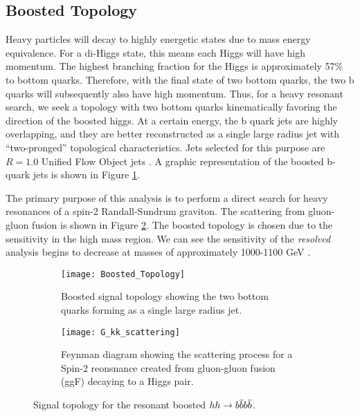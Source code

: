 \documentclass[12pt]{article}
\begin{document}
\subsection{Boosted Topology}
Heavy particles will decay to highly energetic states due to mass energy
equivalence. For a di-Higgs state, this means each Higgs will have high
momentum. The highest branching fraction for the Higgs is approximately 57\% to
bottom quarks. Therefore, with the final state of two bottom quarks, the two b
quarks will subsequently also have high momentum. Thus, for a heavy resonant
search, we seek a topology with two bottom quarks kinematically favoring the
direction of the boosted higgs. At a certain energy, the b quark jets are highly
overlapping, and they are better reconstructed as a single large radius jet with
``two-pronged'' topological characteristics. Jets selected for this purpose are
$R=1.0$ Unified Flow Object jets \cite{boosted_hbbcc_tagger, large_r_jet}. A
graphic representation of the boosted b-quark jets is shown in Figure
\ref{subfig:boosted_topology}. 

The primary purpose of this analysis is to perform a direct search for heavy
resonances of a spin-2 Randall-Sundrum graviton. The scattering from gluon-gluon
fusion is shown in Figure \ref{subfig:feynman}. The boosted topology is chosen
due to the sensitivity in the high mass region. We can see the sensitivity of
the \textit{resolved} analysis begins to decrease at masses of approximately
1000-1100 GeV \cite{atlas_resonant_2022}. 

\begin{figure}[t]
    \centering
    \begin{subfigure}[t]{.48\textwidth}
        \centering
        \texttt{[image: Boosted\_Topology]}
        \caption{Boosted signal topology showing the two bottom quarks forming as a single large radius jet.}
        \label{subfig:boosted_topology}
    \end{subfigure}
    \hfill
    \begin{subfigure}[t]{.48\textwidth}
        \centering
        \texttt{[image: G\_kk\_scattering]}
        \caption{Feynman diagram showing the scattering process for a Spin-2
        reonsnance created from gluon-gluon fusion (ggF) decaying to a Higgs pair.}
        \label{subfig:feynman}
    \end{subfigure}
    \caption{Signal topology for the resonant boosted $hh\rightarrow b\overline{b}b\overline{b}$.}
\label{fig:signal_topologies}
\end{figure}
\end{document}
